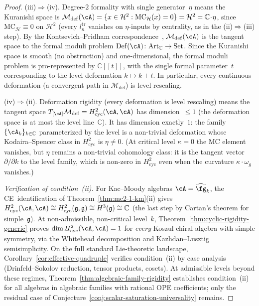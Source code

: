 \begin{proof}
\smallskip\noindent
\textup{(iii)}$\Rightarrow$\textup{(iv)}.
Degree-$2$ formality with single generator~$\eta$ means the
Kuranishi space is
$\mathcal{M}_{\mathrm{def}}(\cA) =
\{x \in \mathcal{H}^2 :
\mathrm{MC}_{\mathcal{H}}(x) = 0\}
= \mathcal{H}^2 = \mathbb{C}\!\cdot\!\eta$,
since $\mathrm{MC}_{\mathcal{H}} \equiv 0$ on
$\mathcal{H}^2$ (every $l_n^{\mathrm{tr}}$
vanishes on $\eta$-inputs by centrality,
as in the (ii)$\Rightarrow$(iii) step).
By the Kontsevich--Pridham correspondence~\cite{Pridham17},
$\mathcal{M}_{\mathrm{def}}(\cA)$ is the tangent space to
the formal moduli problem
$\mathrm{Def}(\cA) \colon \mathrm{Art}_{\mathbb{C}} \to
\mathrm{Set}$.
Since the Kuranishi space is smooth (no obstruction) and
one-dimensional, the formal moduli problem is pro-represented by
$\mathbb{C}[[t]]$, with the single formal parameter~$t$
corresponding to the level deformation
$k \mapsto k + t$.  In particular, every continuous deformation
(a convergent path in $\mathcal{M}_{\mathrm{def}}$) is
level rescaling.

\smallskip\noindent
\textup{(iv)}$\Rightarrow$\textup{(ii)}.
Deformation rigidity (every deformation is level rescaling)
means the tangent space
$T_{[\cA]}\mathcal{M}_{\mathrm{def}}
= H^2_{\mathrm{cyc}}(\cA,\cA)$
has dimension~$\leq 1$
(the deformation space is at most the level line~$\mathbb{C}$).
It has dimension exactly~$1$: the family
$\{\cA_k\}_{k \in \mathbb{C}}$ parameterized by the level
is a non-trivial deformation whose Kodaira--Spencer class
in $H^2_{\mathrm{cyc}}$ is $\eta \neq 0$.
(At critical level $\kappa = 0$ the MC element vanishes, but
$\eta$ remains a non-trivial cohomology class:
it is the tangent vector $\partial/\partial k$ to the level
family, which is non-zero in $H^2_{\mathrm{cyc}}$ even when
the curvature $\kappa \cdot \omega_g$ vanishes.)

\smallskip\noindent
\emph{Verification of condition~\textup{(ii)}.}
For Kac--Moody algebras $\cA = \widehat{\fg}_k$,
the CE~identification of
Theorem~\ref{thm:mc2-1-km}(ii) gives
$H^2_{\mathrm{cyc}}(\cA,\cA) \cong
H^2_{\mathrm{cyc}}(\mathfrak{g},\mathfrak{g})
\cong H^3(\mathfrak{g}) \cong \mathbb{C}$
(the last step by Cartan's theorem for
simple~$\mathfrak{g}$).
At non-admissible, non-critical level~$k$,
Theorem~\ref{thm:cyclic-rigidity-generic}
proves $\dim H^2_{\mathrm{cyc}}(\cA,\cA) = 1$
for \emph{every} Koszul chiral algebra with
simple symmetry, via the Whitehead decomposition
and Kazhdan--Lusztig semisimplicity.
On the full standard Lie-theoretic landscape,
Corollary~\ref{cor:effective-quadruple} verifies
condition~(ii) by case analysis
(Drinfeld--Sokolov reduction, tensor products, cosets).
At admissible levels beyond these regimes,
Theorem~\ref{thm:algebraic-family-rigidity}
establishes condition~(ii) for all algebras in algebraic
families with rational OPE coefficients; only the residual case
of Conjecture~\ref{conj:scalar-saturation-universality} remains.
\end{proof}

